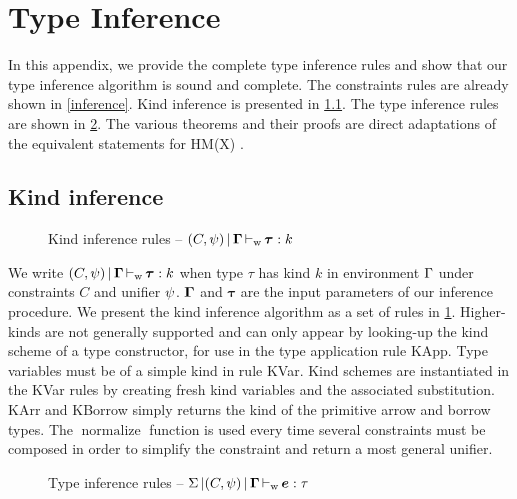 
\section{Type Inference}
\label{appendix:infer}

In this appendix, we provide the complete type inference rules
and show that our type inference algorithm is sound and complete.
The constraints rules are already shown in \cref{inference}.
Kind inference is presented in \cref{rules:kinding:full}.
The type inference rules are shown in \cref{rules:typing:full}.
The various theorems and their proofs are direct adaptations
of the equivalent statements for HM(X) \citep{sulzmann1997proofs}.


\subsection{Kind inference}
\label{rules:kinding:full}
%
\begin{figure}[tb]
  \centering
  
  \caption{Kind inference rules -- $(C,\mathrm{\psi}) \operatorname{|} {\bm{\Gamma}} \operatorname{\vdash_w} {\bm\tau} : k$}
  \label{rules:kinding}
\end{figure}
%
We write $(C,\mathrm{\psi}) \operatorname{|} {\bm{\Gamma}} \operatorname{\vdash_w} {\bm\tau} : k$ when type $\tau$ has kind $k$
in environment $\Gamma$ under constraints $C$ and unifier $\mathrm{\psi}$.
$\bm{\Gamma}$ and $\bm\tau$ are the input parameters of
our inference procedure.
We present the kind inference algorithm as a set of rules in
\cref{rules:kinding}.
Higher-kinds are not generally supported
and can only appear by looking-up the kind scheme of a type constructor,
for use in the type application rule {\sc KApp}.
Type variables must be of a simple kind in rule {\sc KVar}.
Kind schemes are instantiated in the {\sc KVar} rules by creating
fresh kind variables and the associated substitution.
{\sc KArr} and {\sc KBorrow} simply returns the kind of the primitive
arrow and borrow types.
The $\operatorname{normalize}$ function is used every time several constraints
must be composed in order to simplify the constraint and return a most general
unifier.


\begin{figure*}[!btp]
  
  \caption{Type inference rules --
    $\Sigma \operatorname{|} (C,\psi) \operatorname{|} {\bm{\Gamma}} \operatorname{\vdash_w} {\bm e} : \tau$ }
  \label{rules:typing:full}
\end{figure*}






